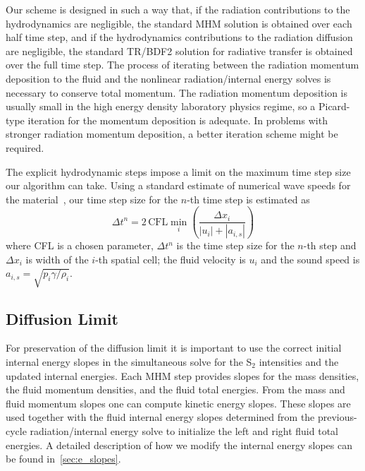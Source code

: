 \documentclass[preprint,12pt]{elsarticle}
\begin{document}
Our scheme is designed in such a way that, 
if the radiation contributions to the hydrodynamics are negligible, the standard MHM solution is obtained over each half time step, and if the hydrodynamics contributions to 
the radiation diffusion are negligible, the standard TR/BDF2 solution for radiative transfer is obtained over the full time step.  The process of iterating 
between the radiation momentum deposition to the fluid and the nonlinear radiation/internal energy solves is necessary to conserve total momentum.  
The radiation momentum deposition is usually small in the high energy density laboratory physics  regime, so a Picard-type iteration for the
momentum deposition is adequate.  In problems 
with stronger radiation momentum deposition, a better iteration scheme might be required. 

The explicit hydrodynamic steps impose a limit on the maximum time step size our
algorithm can take.
Using a standard estimate of numerical wave speeds for the material~\cite{toro}, our time step size for the $n$-th time
step is estimated as
\begin{equation}\label{eq:cfl}
    \Delta t^n = 2\,\text{CFL} \min_{i}\left(\frac{\Delta x_i}{|u_i| + |a_{i,s}|}\right)
\end{equation}
where CFL is a chosen parameter, $\Delta t^n$ is the time step size for the $n$-th step
and $\Delta x_i$ is width of the $i$-th spatial cell; the fluid velocity is $u_i$ and the
sound speed is $a_{i,s}=\sqrt{p_i \gamma/\rho_i}$.



\subsection{Diffusion Limit}
\label{sec:diffusion-limit}
For preservation of the diffusion limit it is important to use the correct initial internal energy slopes in the simultaneous solve for the 
S$_2$ intensities and the updated internal energies.  Each MHM step provides slopes for the mass densities, the fluid momentum densities, 
and the fluid total energies.  From the mass and fluid momentum slopes one can compute kinetic energy slopes.  These slopes are used 
together with the fluid internal energy slopes determined from the previous-cycle radiation/internal energy solve to initialize the left and right 
fluid total energies. A detailed description of how we modify the internal energy slopes can be found in~\ref{sec:e_slopes}.
\end{document}
